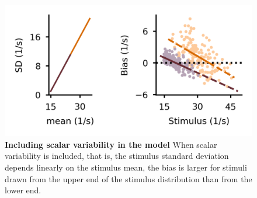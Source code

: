 \documentclass[10pt,a4paper]{article}
\begin{document}
\begin{figure}[!h]
	\centering
    \includegraphics{../results/figures/final/Fig_5_S1}%
\caption{\footnotesize{\bf Including scalar variability in the model \newline}  
When scalar variability is included, that is, the stimulus standard deviation depends linearly on the stimulus mean, the bias is larger for stimuli drawn from the upper end of the stimulus distribution than from the lower end. 
}
\label{fig:Fig_5_S1}
\end{figure}
\end{document}
